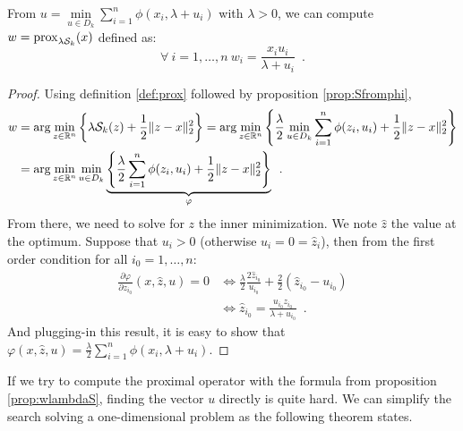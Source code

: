 \begin{proposition}\label{prop:wlambdaS}
From $u=\min\limits_{u\in D_k}\sum_{i=1}^n \phi(x_i,\lambda + u_i)$ with $\lambda > 0$, we can compute $w=\operatorname{prox}_{\lambda\mathcal{S}_k}(x)$ defined as:
\begin{equation}\label{eq:proxui}
    \forall\ i=1,\dots,n\ w_i=\frac{x_iu_i}{\lambda + u_i}\enspace.
\end{equation}
\end{proposition}
\begin{proof}
Using definition \ref{def:prox} followed by proposition \ref{prop:Sfromphi}, \[\begin{aligned}
w&=\arg\min_{z\in\mathbb{R}^n}\left\{\lambda\mathcal{S}_k(z) + \frac{1}{2}\|z-x\|^2_2\right\} = \arg\min_{z\in\mathbb{R}^n}\left\{\frac{\lambda}{2}\min_{u\in D_k}\sum_{i=1}^n\phi(z_i, u_i) + \frac{1}{2}\|z-x\|^2_2\right\}\\
&=\arg\min_{z\in\mathbb{R}^n}\min_{u\in D_k}\underbrace{\left\{\frac{\lambda}{2}\sum_{i=1}^n\phi(z_i, u_i) + \frac{1}{2}\|z-x\|^2_2\right\}}_{\varphi}\enspace.
\end{aligned}\]
From there, we need to solve for $z$ the inner minimization. We note $\hat z$ the value at the optimum. Suppose that $u_i>0$ (otherwise $u_i=0=\hat z_i$), then from the first order condition for all $i_0=1,\dots,n$:
\[\begin{aligned}
\frac{\partial\varphi}{\partial z_{i_0}}(x, \hat z, u)= 0 &\Longleftrightarrow \frac{\lambda}{2}\frac{2\hat z_{i_0}}{u_{i_0}} + \frac{2}{2}(\hat z_{i_0} - u_{i_0})\\
& \Longleftrightarrow \hat z_{i_0} = \frac{u_{i_0}z_{i_0}}{\lambda + u_{i_0}}\enspace.
\end{aligned}\]
And plugging-in this result, it is easy to show that $\varphi(x,\hat z, u) = \frac{\lambda}{2}\sum_{i=1}^n \phi(x_i, \lambda + u_i)$.
\end{proof}

If we try to compute the proximal operator with the formula from proposition \ref{prop:wlambdaS}, finding the vector $u$ directly is quite hard. We can simplify the search solving a one-dimensional problem as the following theorem states.

